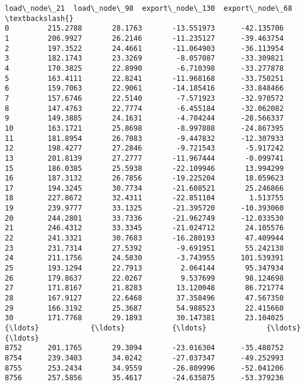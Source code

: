 \documentclass[11pt]{article}
\begin{document}
    \begin{Verbatim}[commandchars=\\\{\}]
      load\_node\_21  load\_node\_98  export\_node\_130  export\_node\_68  \textbackslash{}
0         215.2788       28.1763       -13.551973      -42.135706   
1         206.9927       26.2146       -11.235127      -39.463754   
2         197.3522       24.4661       -11.064903      -36.113954   
3         182.1743       23.3269        -8.057087      -33.309821   
4         170.3825       22.8990        -6.710398      -33.277878   
5         163.4111       22.8241       -11.968168      -33.750251   
6         159.7063       22.9061       -14.185416      -33.848466   
7         157.6746       22.5140        -7.571923      -32.970572   
8         147.4763       22.7774        -6.455184      -32.062082   
9         149.3885       24.1631        -4.704244      -28.566337   
10        163.1721       25.8698        -8.997888      -24.867395   
11        181.8954       26.7083        -9.447832      -12.307933   
12        198.4277       27.2846        -9.721543       -5.917242   
13        201.8139       27.2777       -11.967444       -0.099741   
15        186.0385       25.5938       -22.109946       13.994299   
16        187.3132       26.7856       -19.225204       18.059623   
17        194.3245       30.7734       -21.608521       25.246866   
18        227.8672       32.4311       -22.851104        1.513755   
19        239.9777       33.1325       -21.395720      -10.393060   
20        244.2801       33.7336       -21.962749      -12.033530   
21        246.4312       33.3345       -21.024712       24.105576   
22        241.3321       30.7683       -16.280193       47.409944   
23        231.7314       27.5392        -9.691951       55.242138   
24        211.1756       24.5830        -3.743955      101.539391   
25        193.1294       22.7913         2.064144       95.347934   
26        179.8637       22.0267         9.537699       98.124698   
27        171.8167       21.8283        13.120048       86.721774   
28        167.9127       22.6468        37.358496       47.567350   
29        166.3192       25.3687        54.988523       22.415660   
30        171.7768       29.1893        30.147381       23.104025   
{\ldots}            {\ldots}           {\ldots}              {\ldots}             {\ldots}   
8752      201.1765       29.3094       -23.016304      -35.480752   
8754      239.3403       34.0242       -27.037347      -49.252993   
8755      253.2434       34.9559       -26.809996      -52.041206   
8756      257.5856       35.4617       -24.635875      -53.379236   

\end{Verbatim}
\end{document}
